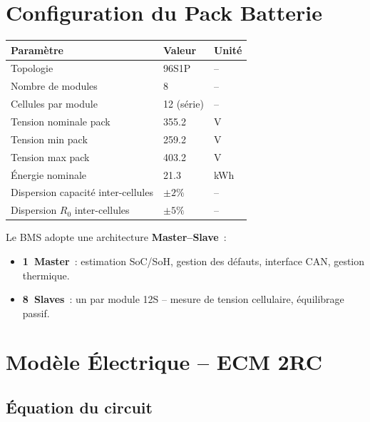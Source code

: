 \documentclass[a4paper,11pt]{article}
\begin{document}
\section{Configuration du Pack Batterie}

\begin{center}
\renewcommand{\arraystretch}{1.4}
\begin{tabular}{p{5.5cm} p{3.5cm} p{3cm}}
\toprule
\textbf{Paramètre} & \textbf{Valeur} & \textbf{Unité} \\
\midrule
Topologie & 96S1P & -- \\
Nombre de modules & 8 & -- \\
Cellules par module & 12 (série) & -- \\
Tension nominale pack & 355.2 & V \\
Tension min pack & 259.2 & V \\
Tension max pack & 403.2 & V \\
Énergie nominale & 21.3 & kWh \\
Dispersion capacité inter-cellules & $\pm 2\%$ & -- \\
Dispersion $R_0$ inter-cellules & $\pm 5\%$ & -- \\
\bottomrule
\end{tabular}
\end{center}

\begin{specbox}
Le BMS adopte une architecture \textbf{Master--Slave}~:
\begin{itemize}[nosep]
  \item \textbf{1~Master}~: estimation SoC/SoH, gestion des défauts, interface CAN, gestion thermique.
  \item \textbf{8~Slaves}~: un par module 12S -- mesure de tension cellulaire, équilibrage passif.
\end{itemize}
\end{specbox}

\section{Modèle Électrique -- ECM 2RC}

\subsection{Équation du circuit}
\end{document}
